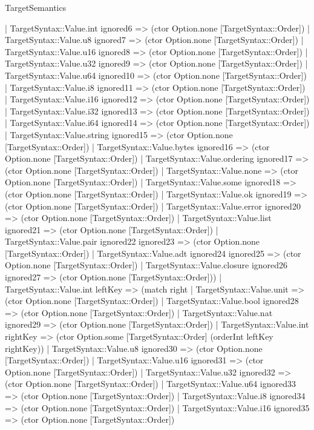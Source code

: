 \begin{lexlean}{TargetSemantics}
\begin{semanticmodule}
{      | TargetSyntax::Value.int ignored6 => (ctor Option.none [TargetSyntax::Order])
      | TargetSyntax::Value.u8 ignored7 => (ctor Option.none [TargetSyntax::Order])
      | TargetSyntax::Value.u16 ignored8 => (ctor Option.none [TargetSyntax::Order])
      | TargetSyntax::Value.u32 ignored9 => (ctor Option.none [TargetSyntax::Order])
      | TargetSyntax::Value.u64 ignored10 => (ctor Option.none [TargetSyntax::Order])
      | TargetSyntax::Value.i8 ignored11 => (ctor Option.none [TargetSyntax::Order])
      | TargetSyntax::Value.i16 ignored12 => (ctor Option.none [TargetSyntax::Order])
      | TargetSyntax::Value.i32 ignored13 => (ctor Option.none [TargetSyntax::Order])
      | TargetSyntax::Value.i64 ignored14 => (ctor Option.none [TargetSyntax::Order])
      | TargetSyntax::Value.string ignored15 => (ctor Option.none [TargetSyntax::Order])
      | TargetSyntax::Value.bytes ignored16 => (ctor Option.none [TargetSyntax::Order])
      | TargetSyntax::Value.ordering ignored17 => (ctor Option.none [TargetSyntax::Order])
      | TargetSyntax::Value.none => (ctor Option.none [TargetSyntax::Order])
      | TargetSyntax::Value.some ignored18 => (ctor Option.none [TargetSyntax::Order])
      | TargetSyntax::Value.ok ignored19 => (ctor Option.none [TargetSyntax::Order])
      | TargetSyntax::Value.error ignored20 => (ctor Option.none [TargetSyntax::Order])
      | TargetSyntax::Value.list ignored21 => (ctor Option.none [TargetSyntax::Order])
      | TargetSyntax::Value.pair ignored22 ignored23 => (ctor Option.none [TargetSyntax::Order])
      | TargetSyntax::Value.adt ignored24 ignored25 => (ctor Option.none [TargetSyntax::Order])
      | TargetSyntax::Value.closure ignored26 ignored27 => (ctor Option.none [TargetSyntax::Order]))
    | TargetSyntax::Value.int leftKey => (match right
      | TargetSyntax::Value.unit => (ctor Option.none [TargetSyntax::Order])
      | TargetSyntax::Value.bool ignored28 => (ctor Option.none [TargetSyntax::Order])
      | TargetSyntax::Value.nat ignored29 => (ctor Option.none [TargetSyntax::Order])
      | TargetSyntax::Value.int rightKey => (ctor Option.some [TargetSyntax::Order] (orderInt leftKey rightKey))
      | TargetSyntax::Value.u8 ignored30 => (ctor Option.none [TargetSyntax::Order])
      | TargetSyntax::Value.u16 ignored31 => (ctor Option.none [TargetSyntax::Order])
      | TargetSyntax::Value.u32 ignored32 => (ctor Option.none [TargetSyntax::Order])
      | TargetSyntax::Value.u64 ignored33 => (ctor Option.none [TargetSyntax::Order])
      | TargetSyntax::Value.i8 ignored34 => (ctor Option.none [TargetSyntax::Order])
      | TargetSyntax::Value.i16 ignored35 => (ctor Option.none [TargetSyntax::Order])
}
\end{semanticmodule}
\end{lexlean}
